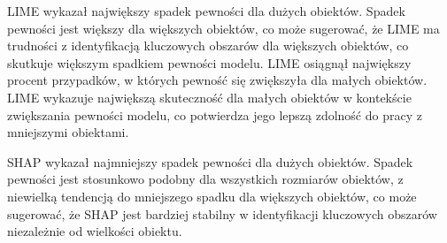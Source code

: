 LIME wykazał największy spadek pewności dla dużych obiektów.
Spadek pewności jest większy dla większych obiektów, co może sugerować, że LIME ma trudności z identyfikacją kluczowych obszarów dla większych obiektów, co skutkuje większym spadkiem pewności modelu.
LIME osiągnął największy procent przypadków, w których pewność się zwiększyła dla małych obiektów.
LIME wykazuje największą skuteczność dla małych obiektów w kontekście zwiększania pewności modelu, co potwierdza jego lepszą zdolność do pracy z mniejszymi obiektami.

SHAP wykazał najmniejszy spadek pewności dla dużych obiektów.
Spadek pewności jest stosunkowo podobny dla wszystkich rozmiarów obiektów, z niewielką tendencją do mniejszego spadku dla większych obiektów, co może sugerować, że SHAP jest bardziej stabilny w identyfikacji kluczowych obszarów niezależnie od wielkości obiektu.

